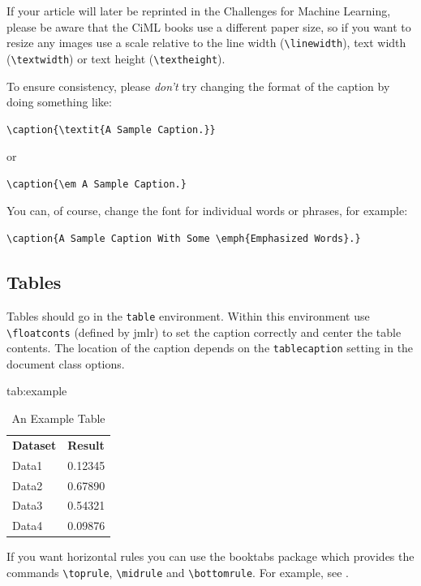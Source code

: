 \documentclass[pmlr,twocolumn]{jmlr} %
\begin{document}
If your article will later be reprinted in the Challenges for
Machine Learning, please be aware that the CiML books use a
different paper size, so if you want to resize any images use a
scale relative to the line width (\verb|\linewidth|), text width
(\verb|\textwidth|) or text height (\verb|\textheight|).

To ensure consistency, please \emph{don't} try changing the format of the caption by doing
something like:
\begin{verbatim}
\caption{\textit{A Sample Caption.}}
\end{verbatim}
or
\begin{verbatim}
\caption{\em A Sample Caption.}
\end{verbatim}
You can, of course, change the font for individual words or 
phrases, for example:
\begin{verbatim}
\caption{A Sample Caption With Some \emph{Emphasized Words}.}
\end{verbatim}

\subsection{Tables}
\label{sec:tables}

Tables should go in the \texttt{table} environment. Within this
environment use \verb|\floatconts| (defined by \textsf{jmlr})
to set the caption correctly and center the table contents.
The location of the caption depends on the \verb|tablecaption|
setting in the document class options.

\begin{table}[htbp]
\floatconts
  {tab:example}%
  {\caption{An Example Table}}%
  {\begin{tabular}{ll}
  \bfseries Dataset & \bfseries Result\\
  Data1 & 0.12345\\
  Data2 & 0.67890\\
  Data3 & 0.54321\\
  Data4 & 0.09876
  \end{tabular}}
\end{table}

If you want horizontal rules you can use the \textsf{booktabs}
package which provides the commands \verb|\toprule|, 
\verb|\midrule| and \verb|\bottomrule|. For example, see
.
\end{document}
